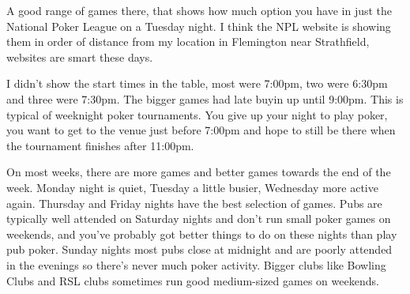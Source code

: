 A good range of games there, that shows how much option you
have in just the National Poker League on a Tuesday night.
I think the NPL website is showing them in order of distance from my
location in Flemington near Strathfield, websites are smart these days.

I didn't show the start times in the table, most were 7:00pm, two were
6:30pm and three were 7:30pm. The bigger games had late buyin
up until 9:00pm. This is typical of weeknight poker
tournaments. You give up your night to play poker,
you want to get to the venue just before 7:00pm and hope to still
be there when the tournament finishes after 11:00pm.

On most weeks, there are more games and better games towards the end
of the week. Monday night is quiet, Tuesday a little busier, Wednesday
more active again. Thursday and Friday nights have the best selection
of games. Pubs are typically well attended on Saturday nights and
don't run small poker games on weekends, and you've probably got
better things to do on these nights than play pub poker. Sunday nights
most pubs close at  midnight and are poorly attended in the evenings
so there's never much poker activity. Bigger clubs like Bowling Clubs
and RSL clubs sometimes run good medium-sized games on weekends.





